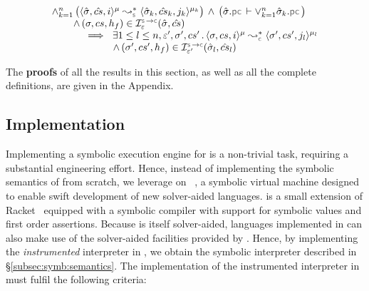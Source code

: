 \begin{corollary}[Verification]\label{corollary:verification}
$$
\begin{array}{l}
\wedge_{k=1}^n \, \big( \transabssemrule{\sstate, \scs, i}{\sstate_k, \scs_k, j_k}{\mode}{\mode_k}{\symbolic}  \big)
    \, \wedge \, \big( \sstate.\pcsel \vdash \vee_{k=1}^n \sstate_k.\pcsel \big)  \\ \quad \quad
    \, \wedge \, (\jstate, \cs, \heap_f) \in \interpret{\symbconc}{\senv}(\sstate, \scs)
    \\ \quad \quad  \quad 
%
      \ \implies \ \exists 1 \leq l \leq n, \senv', \jstate', \cs' \, . \, 
           \transabssemrule{\jstate, \cs, i}{\jstate', \cs', j_l}{\mode}{\mode_l}{\concrete} \\ \quad \quad \quad \quad \quad \quad 
           \, \wedge \, 
           (\jstate', \cs', \heap_f) \in \interpret{\symbconc}{\senv'}(\sstate_l, \scs_l)
\end{array}
$$
\end{corollary}

%
The {\bf proofs} of all the results in this section, as well as all the complete definitions, 
are given in the Appendix.

%
%
%


\subsection{Implementation}\label{subsec:jsil:analysis:implementation}


Implementing a symbolic execution engine for \jsil is a non-trivial 
task, requiring a substantial engineering effort. 
% 
% 
Hence, instead of implementing the symbolic semantics of \jsil from scratch, we leverage on 
\rosette~\cite{Rosette1,Rosette2}, a symbolic virtual machine designed to 
enable swift development of new 
solver-aided languages. 
%
\rosette is a small extension of Racket~\cite{racket} equipped with a symbolic compiler with support 
for symbolic values and first order assertions. Because \rosette is itself solver-aided, languages 
implemented in \rosette can also make use of the solver-aided facilities provided by \rosette. 
Hence, by implementing the \emph{instrumented} \jsil interpreter in \rosette, we obtain the symbolic 
interpreter described in \S\ref{subsec:symb:semantics}. %
%
The implementation of the instrumented interpreter in \rosette must fulfil the following criteria:


